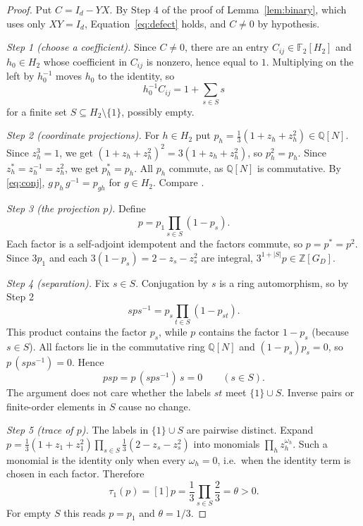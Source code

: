 \documentclass[11pt]{article}
\theoremstyle{remark}
\numberwithin{equation}{section}
\newcommand{\F}{\mathbb F}
\newcommand{\Z}{\mathbb Z}
\newcommand{\Q}{\mathbb Q}
\begin{document}
\begin{proof}
Put $C=I_d-YX$. By Step 4 of the proof of Lemma~\ref{lem:binary}, which uses only $XY=I_d$, Equation~\eqref{eq:defect} holds, and $C\ne0$ by hypothesis.

\emph{Step 1 (choose a coefficient).} Since $C\ne0$, there are an entry $C_{ij}\in\F_2[H_2]$ and $h_0\in H_2$ whose coefficient in $C_{ij}$ is nonzero, hence equal to $1$. Multiplying on the left by $h_0^{-1}$ moves $h_0$ to the identity, so
\begin{equation}\label{eq:support}
 h_0^{-1}C_{ij}=1+\sum_{s\in S}s
\end{equation}
for a finite set $S\subseteq H_2\setminus\{1\}$, possibly empty.

\emph{Step 2 (coordinate projections).} For $h\in H_2$ put $p_h=\tfrac13(1+z_h+z_h^2)\in\Q[N]$. Since $z_h^3=1$, we get $(1+z_h+z_h^2)^2=3(1+z_h+z_h^2)$, so $p_h^2=p_h$. Since $z_h^*=z_h^{-1}=z_h^2$, we get $p_h^*=p_h$. All $p_h$ commute, as $\Q[N]$ is commutative. By \eqref{eq:conj}, $g\,p_h\,g^{-1}=p_{gh}$ for $g\in H_2$. Compare \cite[Lemmas 3.1 and 3.4]{DicksSchick2002}.

\emph{Step 3 (the projection $p$).} Define
\[
 p=p_1\prod_{s\in S}(1-p_s).
\]
Each factor is a self-adjoint idempotent and the factors commute, so $p=p^*=p^2$. Since $3p_1$ and each $3(1-p_s)=2-z_s-z_s^2$ are integral, $3^{1+|S|}p\in\Z[G_D]$.

\emph{Step 4 (separation).} Fix $s\in S$. Conjugation by $s$ is a ring automorphism, so by Step 2
\[
 sps^{-1}=p_s\prod_{t\in S}(1-p_{st}).
\]
This product contains the factor $p_s$, while $p$ contains the factor $1-p_s$ (because $s\in S$). All factors lie in the commutative ring $\Q[N]$ and $(1-p_s)p_s=0$, so $p\,(sps^{-1})=0$. Hence
\begin{equation}\label{eq:separation}
 psp=p\,(sps^{-1})\,s=0\qquad(s\in S).
\end{equation}
The argument does not care whether the labels $st$ meet $\{1\}\cup S$. Inverse pairs or finite-order elements in $S$ cause no change.

\emph{Step 5 (trace of $p$).} The labels in $\{1\}\cup S$ are pairwise distinct. Expand $p=\tfrac13(1+z_1+z_1^2)\prod_{s\in S}\tfrac13(2-z_s-z_s^2)$ into monomials $\prod_hz_h^{\omega_h}$. Such a monomial is the identity only when every $\omega_h=0$, i.e.\ when the identity term is chosen in each factor. Therefore
\begin{equation}\label{eq:theta}
 \tau_1(p)=[1]p=\frac13\prod_{s\in S}\frac23=\theta>0.
\end{equation}
For empty $S$ this reads $p=p_1$ and $\theta=1/3$.


\end{proof}
\end{document}
